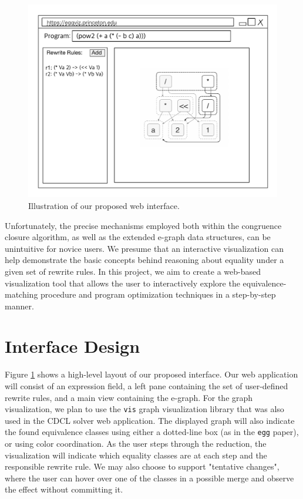 \documentclass[letterpaper,twocolumn,10pt]{article}
\begin{document}
\begin{figure}[t]
    \centering
    \includegraphics[width=.7\linewidth]{eggviz-ui.pdf}
    \caption{Illustration of our proposed web interface.}
    \label{fig:ui}
\end{figure}

Unfortunately, the precise mechanisms employed both within the congruence closure algorithm, as well as the extended e-graph data structures, can be unintuitive for novice users. We presume that an interactive visualization can help demonstrate the basic concepts behind reasoning about equality under a given set of rewrite rules. In this project, we aim to create a web-based visualization tool that allows the user to interactively explore the equivalence-matching procedure and program optimization techniques in a step-by-step manner.

\section{Interface Design}


Figure \ref{fig:ui} shows a high-level layout of our proposed interface. Our web application will consist of an expression field, a left pane containing the set of user-defined rewrite rules, and a main view containing the e-graph. For the graph visualization, we plan to use the \texttt{vis} graph visualization library that was also used in the CDCL solver web application. The displayed graph will also indicate the found equivalence classes using either a dotted-line box (as in the \texttt{egg} paper), or using color coordination. As the user steps through the reduction, the visualization will indicate which equality classes are at each step and the responsible rewrite rule. We may also choose to support "tentative changes", where the user can hover over one of the classes in a possible merge and observe the effect without committing it.
\end{document}
